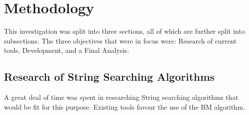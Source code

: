 
\chapter{Methodology}
\label{chap:chapter3}
This investigation was split into three sections, all of which are further split into subsections.
The three objectives that were in focus were: Research of current tools, Development, and a Final Analysis.

\section{Research of String Searching Algorithms}
A great deal of time was spent in researching String searching algorithms that would be fit for this purpose.
Existing tools favour the use of the \acf{BM} algorithm.

